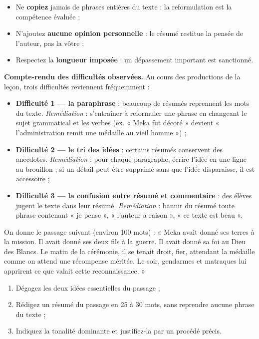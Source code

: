 \documentclass[11pt]{article}
\newcounter{popsec}
\newcounter{popsub}
\newcommand{\courssub}[1]{%
  \stepcounter{popsub}%
  \par\vspace{9pt}\noindent{\popxbold\fontsize{11.5}{13}\selectfont\color{popink}{\color{poporange}\thepopsec.\thepopsub}\hspace{6pt}#1}\par\nopagebreak\vspace{4pt}
}
\begin{document}
\begin{attention}
\begin{itemize}
\item Ne \textbf{copiez} jamais de phrases entières du texte : la reformulation est la compétence évaluée ;
\item N'ajoutez \textbf{aucune opinion personnelle} : le résumé restitue la pensée de l'auteur, pas la vôtre ;
\item Respectez la \textbf{longueur imposée} : un dépassement important est sanctionné.
\end{itemize}
\end{attention}

\courssub{Compte-rendu et remédiation}

\textbf{Compte-rendu des difficultés observées.} Au cours des productions de la leçon, trois difficultés reviennent fréquemment :
\begin{itemize}
\item \textbf{Difficulté 1 — la paraphrase} : beaucoup de résumés reprennent les mots du texte. \emph{Remédiation} : s'entraîner à reformuler une phrase en changeant le sujet grammatical et les verbes (ex. « Meka fut décoré » devient « l'administration remit une médaille au vieil homme ») ;
\item \textbf{Difficulté 2 — le tri des idées} : certains résumés conservent des anecdotes. \emph{Remédiation} : pour chaque paragraphe, écrire l'idée en une ligne au brouillon ; si un détail peut être supprimé sans que l'idée disparaisse, il est accessoire ;
\item \textbf{Difficulté 3 — la confusion entre résumé et commentaire} : des élèves jugent le texte dans leur résumé. \emph{Remédiation} : bannir du résumé toute phrase contenant « je pense », « l'auteur a raison », « ce texte est beau ».
\end{itemize}

\begin{exercice}
On donne le passage suivant (environ 100 mots) : « Meka avait donné ses terres à la mission. Il avait donné ses deux fils à la guerre. Il avait donné sa foi au Dieu des Blancs. Le matin de la cérémonie, il se tenait droit, fier, attendant la médaille comme on attend une récompense méritée. Le soir, gendarmes et matraques lui apprirent ce que valait cette reconnaissance. »
\begin{enumerate}
\item Dégagez les deux idées essentielles du passage ;
\item Rédigez un résumé du passage en 25 à 30 mots, sans reprendre aucune phrase du texte ;
\item Indiquez la tonalité dominante et justifiez-la par un procédé précis.
\end{enumerate}
\end{exercice}
\end{document}
